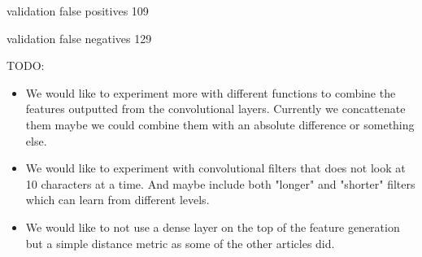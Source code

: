 validation false positives 109

validation false negatives 129

TODO:
\begin{itemize}
    \item We would like to experiment more with different functions to combine
        the features outputted from the convolutional layers. Currently we
        concattenate them maybe we could combine them with an absolute
        difference or something else.
    \item We would like to experiment with convolutional filters that does not
        look at 10 characters at a time. And maybe include both "longer" and
        "shorter" filters which can learn from different levels.
    \item We would like to not use a dense layer on the top of the feature
        generation but a simple distance metric as some of the other articles
        did.
\end{itemize}
